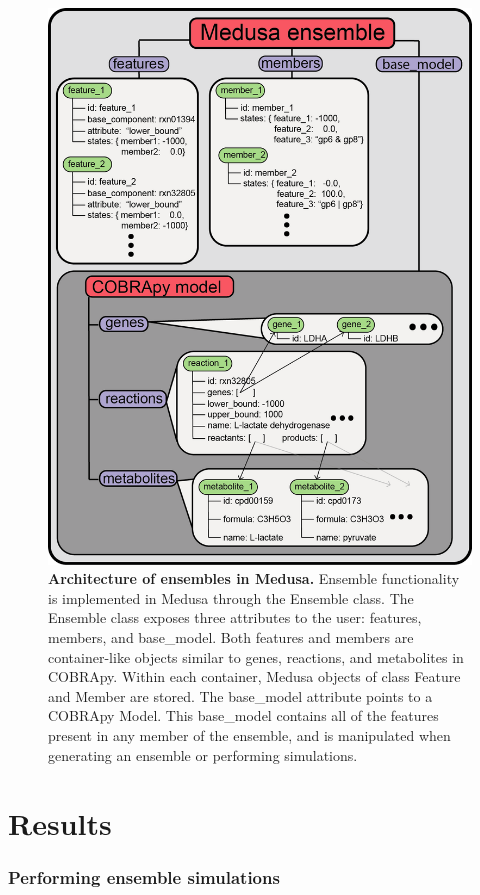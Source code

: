 \documentclass[11pt,twocolumn,notitlepage,openany,twoside]{book}
\begin{document}
\begin{refsection}
\begin{figure}[tb]
\centering
\includegraphics[width=0.9\linewidth]{ch4_fig1}
\caption[ Architecture of ensembles in Medusa.]{\textbf{ Architecture of ensembles in Medusa.} Ensemble functionality is implemented in Medusa through the Ensemble class. The Ensemble class exposes three attributes to the user: features, members, and base\_model. Both features and members are container-like objects similar to genes, reactions, and metabolites in COBRApy. Within each container, Medusa objects of class Feature and Member are stored. The base\_model attribute points to a COBRApy Model. This base\_model contains all of the features present in any member of the ensemble, and is manipulated when generating an ensemble or performing simulations.}
\end{figure}

\section{Results}
\subsubsection{Performing ensemble simulations}



\end{refsection}
\end{document}
